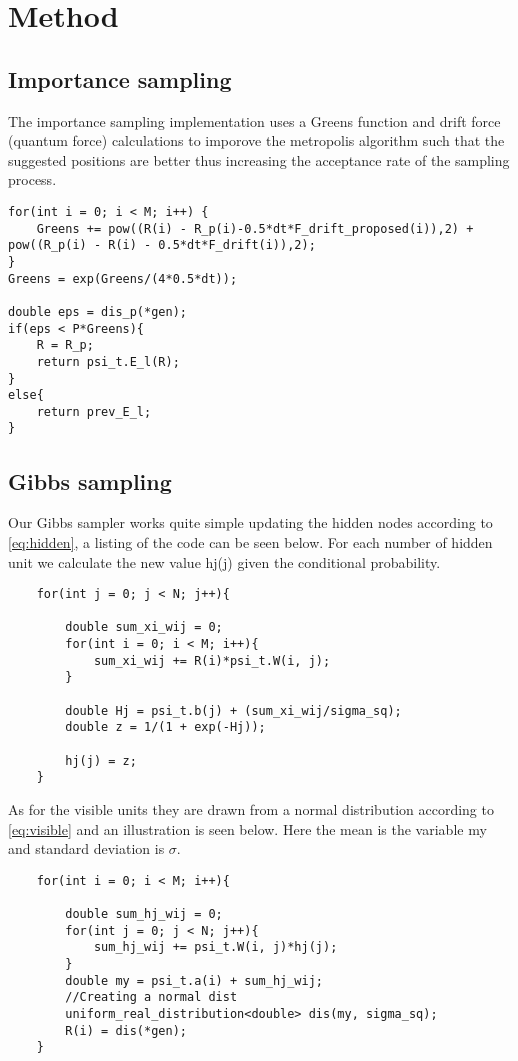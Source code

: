 \section{Method}
\subsection{Importance sampling}
The importance sampling implementation uses a Greens function and drift force (quantum force)
calculations to imporove the metropolis algorithm such that the suggested positions
are better thus increasing the acceptance rate of the sampling process.
\begin{lstlisting}
for(int i = 0; i < M; i++) {
	Greens += pow((R(i) - R_p(i)-0.5*dt*F_drift_proposed(i)),2) + pow((R_p(i) - R(i) - 0.5*dt*F_drift(i)),2);
}
Greens = exp(Greens/(4*0.5*dt));

double eps = dis_p(*gen);
if(eps < P*Greens){
	R = R_p;
	return psi_t.E_l(R);
}
else{
	return prev_E_l;
}
\end{lstlisting}

\subsection{Gibbs sampling}

Our Gibbs sampler works quite simple updating the hidden nodes according to \eqref{eq:hidden}, a listing of the code can be seen below. For each number of hidden unit we calculate the new value hj(j) given the conditional probability.

\begin{lstlisting}
    for(int j = 0; j < N; j++){

        double sum_xi_wij = 0;
        for(int i = 0; i < M; i++){
            sum_xi_wij += R(i)*psi_t.W(i, j);
        }

        double Hj = psi_t.b(j) + (sum_xi_wij/sigma_sq);
        double z = 1/(1 + exp(-Hj));

        hj(j) = z;
    }
\end{lstlisting}

As for the visible units they are drawn from a normal distribution according to \eqref{eq:visible} and an illustration is seen below. Here the mean is the variable my and standard deviation is $\sigma$.


\begin{lstlisting}
    for(int i = 0; i < M; i++){

        double sum_hj_wij = 0;
        for(int j = 0; j < N; j++){
            sum_hj_wij += psi_t.W(i, j)*hj(j);
        }
        double my = psi_t.a(i) + sum_hj_wij;
        //Creating a normal dist
        uniform_real_distribution<double> dis(my, sigma_sq);
        R(i) = dis(*gen);
    }
\end{lstlisting}

